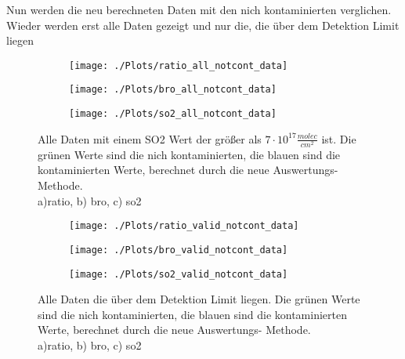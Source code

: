\documentclass[]{article}
\begin{document}
\FloatBarrier 
%
Nun werden die neu berechneten Daten mit den nich kontaminierten verglichen.
Wieder werden erst alle Daten gezeigt und nur die, die über dem Detektion Limit liegen\\
%
\newline
\newline
%
\begin{figure}[h!]
   \begin{subfigure}[t]{0.33\textwidth} 
		\texttt{[image: ./Plots/ratio\_all\_notcont\_data]}
		\caption{}
		\label{fig:ratio_all_data}
   \end{subfigure}\hfill%
   \begin{subfigure}[t]{0.33\textwidth} 
	\texttt{[image: ./Plots/bro\_all\_notcont\_data]}
	\caption{}
	\label{fig:ratio_all_data}
   \end{subfigure} %
   \begin{subfigure}[t]{0.33\textwidth} 
		\texttt{[image: ./Plots/so2\_all\_notcont\_data]}
		\caption{}
		\label{fig:ratio_all_data}
   \end{subfigure} 
   \caption{Alle Daten mit einem SO2 Wert der größer als $7\cdot10^{17}\frac{molec}{cm^2}$ ist. Die grünen Werte sind die nich kontaminierten,
   die blauen sind die kontaminierten Werte, berechnet durch die neue Auswertungs- Methode.\\
   a)ratio, b) bro, c) so2} 
   \label{fig:demo2} 
\end{figure} 
%
\begin{figure}[h]
   \begin{subfigure}[t]{0.33\textwidth} 
		\texttt{[image: ./Plots/ratio\_valid\_notcont\_data]}
		\caption{}
		\label{fig:ratio_all_data}
   \end{subfigure}\hfill%
   \begin{subfigure}[t]{0.33\textwidth} 
	\texttt{[image: ./Plots/bro\_valid\_notcont\_data]}
	\caption{}
	\label{fig:ratio_all_data}
   \end{subfigure} %
   \begin{subfigure}[t]{0.33\textwidth} 
		\texttt{[image: ./Plots/so2\_valid\_notcont\_data]}
		\caption{}
		\label{fig:ratio_all_data}
   \end{subfigure} 
   \caption{Alle Daten die über dem Detektion Limit liegen. Die grünen Werte sind die nich kontaminierten,
      die blauen sind die kontaminierten Werte, berechnet durch die neue Auswertungs- Methode.\\
   a)ratio, b) bro, c) so2} 
   \label{fig:demo3} 
\end{figure}
\end{document}
